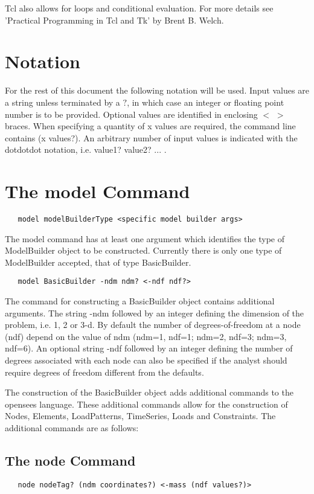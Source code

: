 \documentclass[12pt]{article}
\begin{document}
Tcl also allows for loops and conditional evaluation. For more
details see 'Practical Programming in Tcl and Tk' by Brent B. Welch.

\section{Notation}
For the rest of this document the following notation will be
used. Input values are a string unless terminated by a $?$, in which
case an 
integer or floating point number is to be provided. Optional values
are identified in enclosing $<$ $>$ braces. When specifying a quantity
of x values are required, the command line contains (x values?). An
arbitrary number of input values is indicated with the dotdotdot
notation, i.e. value1? value2? ... .


\section{The model Command}
{\sf\small
\begin{verbatim}
   model modelBuilderType <specific model builder args>
\end{verbatim}
}

\noindent The model command has at least one argument which identifies
the type of ModelBuilder object to be constructed. Currently there is
only one type of ModelBuilder accepted, that of type BasicBuilder. 

{\sf\small
\begin{verbatim}
   model BasicBuilder -ndm ndm? <-ndf ndf?>
\end{verbatim}
}

\noindent The command for constructing a BasicBuilder object contains
additional arguments. The string -ndm followed by an integer
defining the dimension of the problem, i.e. 1, 2 or 3-d. By default the
number of degrees-of-freedom at a node (ndf) depend on the value of
ndm (ndm=1, ndf=1; ndm=2, ndf=3; ndm=3, ndf=6). An optional
string -ndf followed by an integer defining the number of degrees
associated with each node can also be specified if the analyst should
require degrees of freedom different from the defaults.

The construction of the BasicBuilder object adds additional commands
to the opensees language. These additional commands allow for the
construction of Nodes, Elements, LoadPatterns, TimeSeries, Loads and
Constraints. The additional commands are as follows:

\subsection{The node Command}
{\sf\small
\begin{verbatim}
   node nodeTag? (ndm coordinates?) <-mass (ndf values?)>
\end{verbatim}
}
\end{document}

